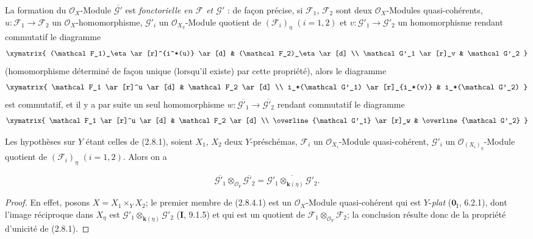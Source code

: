 \begin{env}[2.8.3]
\label{IV.2.8.3-fr}
La formation du $\mathcal O_X$-Module $\overline{\mathcal G'}$ est
\emph{fonctorielle en $\mathcal F$ et $\mathcal G'$} : de façon précise, si
$\mathcal F_1$, $\mathcal F_2$ sont deux $\mathcal O_X$-Modules
quasi-cohérents, $u:\mathcal F_1\to\mathcal F_2$ un
$\mathcal O_X$-homomorphisme, $\mathcal G'_i$ un
$\mathcal O_{X_\eta}$-Module quotient de $(\mathcal F_i)_\eta$ $(i=1,2)$ et
$v:\mathcal G'_1\to\mathcal G'_2$ un homomorphisme rendant commutatif le
diagramme
\[
\xymatrix{
(\mathcal F_1)_\eta \ar[r]^{i^*(u)} \ar[d] &
(\mathcal F_2)_\eta \ar[d] \\
\mathcal G'_1 \ar[r]_v & \mathcal G'_2
}
\]
(homomorphisme déterminé de façon unique (lorsqu'il existe) par cette
propriété), alors le diagramme
\[
\xymatrix{
\mathcal F_1 \ar[r]^u \ar[d] & \mathcal F_2 \ar[d] \\
i_*(\mathcal G'_1) \ar[r]_{i_*(v)} & i_*(\mathcal G'_2)
}
\]
est commutatif, et il y a par suite un seul homomorphisme
$w:\overline{\mathcal G'_1}\to\overline{\mathcal G'_2}$ rendant commutatif
le diagramme
\[
\xymatrix{
\mathcal F_1 \ar[r]^u \ar[d] & \mathcal F_2 \ar[d] \\
\overline{\mathcal G'_1} \ar[r]_w & \overline{\mathcal G'_2}
}
\]
\end{env}

\begin{proposition}[2.8.4]
\label{IV.2.8.4-fr}
Les hypothèses sur $Y$ étant celles de \textup{(2.8.1)}, soient $X_1$, $X_2$ deux
$Y$-préschémas, $\mathcal F_i$ un $\mathcal O_{X_i}$-Module
quasi-cohérent, $\mathcal G'_i$ un $\mathcal O_{(X_i)_\eta}$-Module quotient
de $(\mathcal F_i)_\eta$ $(i=1,2)$. Alors on a
\end{proposition}

\begin{env}[2.8.4.1]
\label{IV.2.8.4.1-fr}
\[
\overline{\mathcal G'_1}\otimes_{\mathcal O_Y}\overline{\mathcal G'_2}
=\overline{\mathcal G'_1\otimes_{\mathbf{k}(\eta)}\mathcal G'_2}.
\]
\end{env}

\begin{proof}
En effet, posons $X=X_1\times_Y X_2$; le premier membre de (2.8.4.1) est
un $\mathcal O_X$-Module quasi-cohérent qui est $Y$-\emph{plat}
($\mathbf{0}_{\mathrm I}$, 6.2.1), dont l'image réciproque dans $X_\eta$ est
$\mathcal G'_1\otimes_{\mathbf{k}(\eta)}\mathcal G'_2$ (\textbf{I}, 9.1.5) et qui est un
quotient de $\mathcal F_1\otimes_{\mathcal O_Y}\mathcal F_2$; la conclusion
résulte donc de la propriété d'unicité de (2.8.1).
\end{proof}

